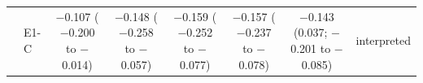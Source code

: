 \begin{longtable}{@{}p{3.6cm}lcccccp{2.6cm}@{}}
 & E1-C & \makecell{$-$0.107\\{\scriptsize ($-$0.200 to $-$0.014)}} & \makecell{$-$0.148\\{\scriptsize ($-$0.258 to $-$0.057)}} & \makecell{$-$0.159\\{\scriptsize ($-$0.252 to $-$0.077)}} & \makecell{$-$0.157\\{\scriptsize ($-$0.237 to $-$0.078)}} & \makecell{$-$0.143\\{\scriptsize (0.037; $-$0.201 to $-$0.085)}} & interpreted \\
\end{longtable}

